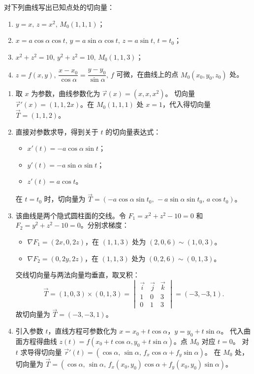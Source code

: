 \documentclass[lang=cn,11pt]{elegantbook}
\begin{document}
\begin{exercise}[曲线切向量的基本计算]
对下列曲线写出已知点处的切向量：
\begin{enumerate}
    \item[(1)] $y=x,\,z=x^2,\,M_0(1,1,1)$；
    \item[(2)] $x=a\cos\alpha\cos t,\,y=a\sin\alpha\cos t,\,z=a\sin t,\,t=t_0$；
    \item[(3)] $x^2+z^2=10,\,y^2+z^2=10,\,M_0(1,1,3)$；
    \item[(4)] $z=f(x,y),\,\dfrac{x-x_0}{\cos\alpha}=\dfrac{y-y_0}{\sin\alpha},\,f$ 可微，在曲线上的点 $M_0(x_0,y_0,z_0)$ 处。
\end{enumerate}
\end{exercise}
\begin{solution}
\begin{enumerate}
    \item[(1)] 取 $x$ 为参数，曲线参数化为 $\vec{r}(x) = (x, x, x^2)$。
    切向量 $\vec{r}'(x) = (1, 1, 2x)$。在 $M_0(1,1,1)$ 处 $x=1$，代入得切向量 $\vec{T} = (1, 1, 2)$。

    \item[(2)] 直接对参数求导，得到关于 $t$ 的切向量表达式：
    \begin{itemize}
        \item $x'(t) = -a\cos\alpha\sin t$；
        \item $y'(t) = -a\sin\alpha\sin t$；
        \item $z'(t) = a\cos t$。
    \end{itemize}
    在 $t=t_0$ 时，切向量为 $\vec{T} = (-a\cos\alpha\sin t_0,\, -a\sin\alpha\sin t_0,\, a\cos t_0)$。

    \item[(3)] 该曲线是两个隐式圆柱面的交线。令 $F_1 = x^2+z^2-10 = 0$ 和 $F_2 = y^2+z^2-10 = 0$。分别求梯度：
    \begin{itemize}
        \item $\nabla F_1 = (2x, 0, 2z)$，在 $(1,1,3)$ 处为 $(2, 0, 6) \sim (1, 0, 3)$。
        \item $\nabla F_2 = (0, 2y, 2z)$，在 $(1,1,3)$ 处为 $(0, 2, 6) \sim (0, 1, 3)$。
    \end{itemize}
    交线切向量与两法向量均垂直，取叉积：
    \[ \vec{T} = (1, 0, 3) \times (0, 1, 3) = \begin{vmatrix} \vec{i} & \vec{j} & \vec{k} \\ 1 & 0 & 3 \\ 0 & 1 & 3 \end{vmatrix} = (-3, -3, 1). \]
    故切向量为 $\vec{T} = (-3, -3, 1)$。

    \item[(4)] 引入参数 $t$，直线方程可参数化为 $x = x_0 + t\cos\alpha$，$y = y_0 + t\sin\alpha$。
    代入曲面方程得曲线 $z(t) = f(x_0+t\cos\alpha, y_0+t\sin\alpha)$。点 $M_0$ 对应 $t=0$。
    对 $t$ 求导得切向量 $\vec{r}'(t) = (\cos\alpha,\, \sin\alpha,\, f_x\cos\alpha + f_y\sin\alpha)$。
    在 $M_0$ 处，切向量为 $\vec{T} = (\cos\alpha,\, \sin\alpha,\, f_x(x_0,y_0)\cos\alpha + f_y(x_0,y_0)\sin\alpha)$。
\end{enumerate}
\end{solution}
\end{document}
